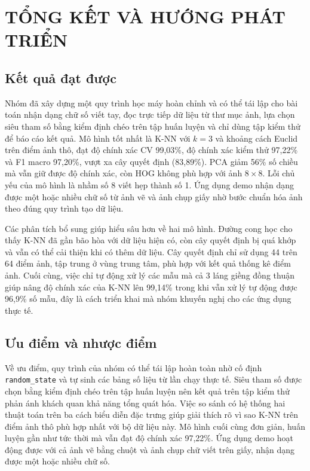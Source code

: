 \documentclass[a4paper,oneside]{report}
\begin{document}
\chapter{TỔNG KẾT VÀ HƯỚNG PHÁT TRIỂN}

\section{Kết quả đạt được}

Nhóm đã xây dựng một quy trình học máy hoàn chỉnh và có thể tái lập cho bài toán nhận dạng chữ số viết tay, đọc
trực tiếp dữ liệu từ thư mục ảnh, lựa chọn siêu tham số bằng kiểm định chéo trên tập huấn luyện và chỉ dùng tập
kiểm thử để báo cáo kết quả. Mô hình tốt nhất là K-NN với $k = 3$ và khoảng cách Euclid trên điểm ảnh thô, đạt độ
chính xác CV 99,03\%, độ chính xác kiểm thử 97,22\% và F1 macro 97,20\%, vượt xa cây quyết định (83,89\%). PCA giảm
56\% số chiều mà vẫn giữ được độ chính xác, còn HOG không phù hợp với ảnh $8 \times 8$. Lỗi chủ yếu của mô hình là
nhầm số 8 viết hẹp thành số 1. Ứng dụng demo nhận dạng được một hoặc nhiều chữ số từ ảnh vẽ và ảnh chụp giấy nhờ
bước chuẩn hóa ảnh theo đúng quy trình tạo dữ liệu.

Các phân tích bổ sung giúp hiểu sâu hơn về hai mô hình. Đường cong học cho thấy K-NN đã gần bão hòa với dữ liệu hiện
có, còn cây quyết định bị quá khớp và vẫn có thể cải thiện khi có thêm dữ liệu. Cây quyết định chỉ sử dụng 44 trên
64 điểm ảnh, tập trung ở vùng trung tâm, phù hợp với kết quả thống kê điểm ảnh. Cuối cùng, việc chỉ tự động xử lý
các mẫu mà cả 3 láng giềng đồng thuận giúp nâng độ chính xác của K-NN lên 99,14\% trong khi vẫn xử lý tự động được
96,9\% số mẫu, đây là cách triển khai mà nhóm khuyến nghị cho các ứng dụng thực tế.

\section{Ưu điểm và nhược điểm}

Về ưu điểm, quy trình của nhóm có thể tái lập hoàn toàn nhờ cố định \texttt{random\_state} và tự sinh các bảng số
liệu từ lần chạy thực tế. Siêu tham số được chọn bằng kiểm định chéo trên tập huấn luyện nên kết quả trên tập
kiểm thử phản ánh khách quan khả năng tổng quát hóa. Việc so sánh có hệ thống hai thuật toán trên ba cách biểu diễn
đặc trưng giúp giải thích rõ vì sao K-NN trên điểm ảnh thô phù hợp nhất với bộ dữ liệu này. Mô hình cuối cùng đơn
giản, huấn luyện gần như tức thời mà vẫn đạt độ chính xác 97,22\%. Ứng dụng demo hoạt động được với cả ảnh vẽ bằng
chuột và ảnh chụp chữ viết trên giấy, nhận dạng được một hoặc nhiều chữ số.
\end{document}
